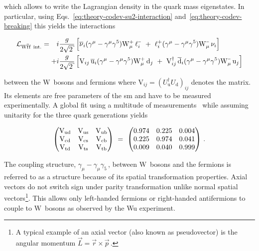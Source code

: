 which allows to write the Lagrangian density in the quark mass eigenstates. In particular, using Eqs.~\ref{eq:theory-codev-su2-interaction} and~\ref{eq:theory-codev-breaking} this yields the interactions

\begin{align}
\mathcal{L}_{\mathrm{W}\bar{\mathrm{f}}\mathrm{f}~\mathrm{int.}}=\hphantom{+}i&\frac{g}{2\sqrt{2}}\,\Big[\bar{\nu}_{i}(\gamma^\mu-\gamma^\mu\gamma^5) \mathrm{W}^{\rmplus}_\mu\,\ell^{\rmminus}_{i}~+~{\ell}^{\rmplus}_{i}(\gamma^\mu-\gamma^\mu\gamma^5) \mathrm{W}^{\rmminus}_\mu\,\nu_{i}\Big]\nonumber\\
+i&\frac{g}{2\sqrt{2}}\,\Big[\mathrm{V}_{ij}\,\bar{\mathrm{u}}_{i}(\gamma^\mu-\gamma^\mu\gamma^5) \mathrm{W}^{\rmplus}_\mu\,\mathrm{d}_{j}~+~\mathrm{V}_{ij}^\dagger\,\bar{\mathrm{d}}_{i}(\gamma^\mu-\gamma^\mu\gamma^5) \mathrm{W}^{\rmminus}_\mu\,\mathrm{u}_{j}\Big] \label{eq:theory-qqW-int}
\end{align}

between the $\mathrm{W}$~bosons and fermions where $\mathrm{V}_{ij}=(U^\dagger_\mathrm{u}U_\mathrm{d})_{ij}$ denotes the  matrix. Its elements are free parameters of the \gls{sm} and have to be measured experimentally. A global fit using a multitude of measurements~\cite{Olive:2016xmw} while assuming unitarity for the three quark generations yields

\begin{equation}
\begin{pmatrix}
{\textrm{V}_\textrm{ud}} & {\textrm{V}_\textrm{us}} & {\textrm{V}_\textrm{ub}} \\
{\textrm{V}_\textrm{cd}} & {\textrm{V}_\textrm{cs}} & {\textrm{V}_\textrm{cb}} \\
{\textrm{V}_\textrm{td}} & {\textrm{V}_\textrm{ts}} & {\textrm{V}_\textrm{tb}} 
\end{pmatrix}
~=~
\begin{pmatrix}
0.974 & 0.225 & 0.004 \\
0.225 & 0.974 & 0.041 \\
0.009 & 0.040 & 0.999 
\end{pmatrix}\,.
\end{equation}

The coupling structure, $\gamma_{\mu}-\gamma_{\mu}\gamma_{5}\,$, between $\mathrm{W}$~bosons and the fermions is referred to as a  structure because of its spatial transformation properties. Axial vectors do not switch sign under parity transformation  unlike normal spatial vectors\footnote{A typical example of an axial vector (also known as pseudovector) is the angular momentum $\vec{L}=\vec{r}\times \vec{p}\,$.}. This allows only left-handed fermions or right-handed antifermions to couple to $\mathrm{W}$~bosons as observed by the Wu experiment.

